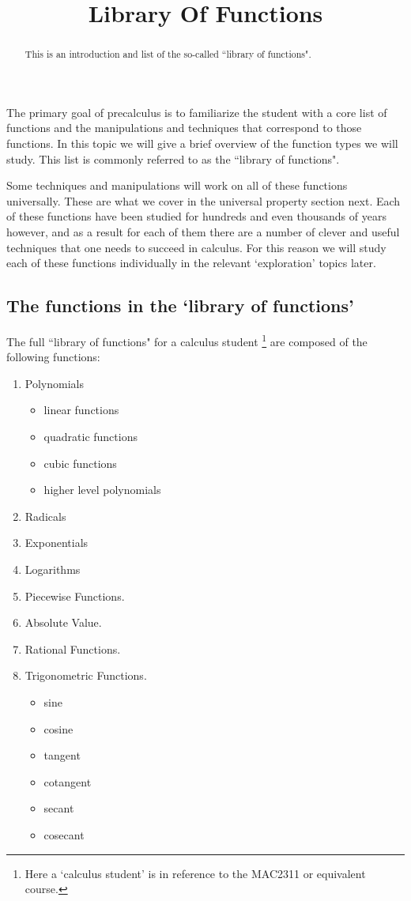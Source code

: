 \documentclass{ximera}
\title{Library Of Functions}
\begin{document}
\begin{abstract}
This is an introduction and list of the so-called ``library of functions".
\end{abstract}
\maketitle

The primary goal of precalculus is to familiarize the student with a core list of functions and the manipulations and techniques that correspond to those functions. In this topic we will give a brief overview of the function types we will study. This list is commonly referred to as the ``library of functions".

Some techniques and manipulations will work on all of these functions universally. These are what we cover in the universal property section next. Each of these functions have been studied for hundreds and even thousands of years however, and as a result for each of them there are a number of clever and useful techniques that one needs to succeed in calculus. For this reason we will study each of these functions individually in the relevant `exploration' topics later.

\subsection*{The functions in the `library of functions'}
    The full ``library of functions" for a calculus student%
    \footnote{%
        Here a `calculus student' is in reference to the MAC2311 or equivalent course.%
        }
    are composed of the following functions:
    \begin{enumerate}
        \item Polynomials
        \begin{itemize}
            \item linear functions
            \item quadratic functions
            \item cubic functions
            \item higher level polynomials
        \end{itemize}
        \item Radicals
        \item Exponentials
        \item Logarithms
        \item Piecewise Functions.
        \item Absolute Value.
        \item Rational Functions.
        \item Trigonometric Functions.
        \begin{itemize}
            \item sine
            \item cosine
            \item tangent
            \item cotangent
            \item secant
            \item cosecant
        \end{itemize}
    \end{enumerate}
    
\end{document}
